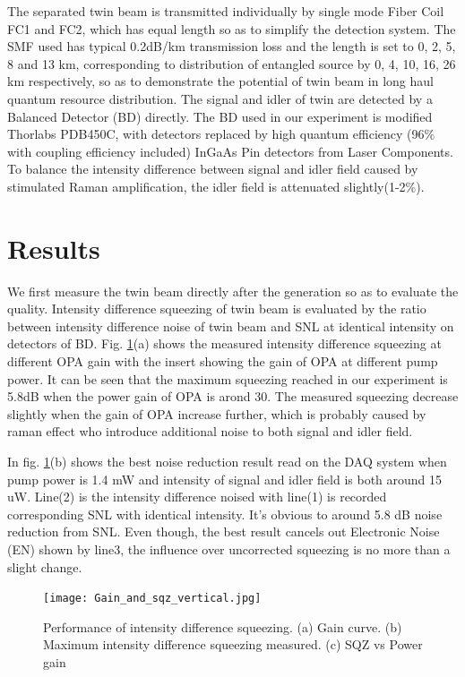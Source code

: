 \documentclass[9pt,twocolumn,twoside]{osajnl}
\begin{document}
The separated twin beam is transmitted individually by single mode Fiber Coil FC1 and FC2, which has equal length so as to simplify the detection system.
The SMF used has typical 0.2dB/km transmission loss and the length is set to 0, 2, 5, 8 and 13 km, corresponding to distribution of entangled source by 0, 4, 10, 16, 26 km respectively, so as to demonstrate the potential of twin beam in long haul quantum resource distribution.
The signal and idler of twin are detected by a Balanced Detector (BD) directly. The BD used in our experiment is modified Thorlabs PDB450C, with detectors replaced by high quantum efficiency (96\% with coupling efficiency included) InGaAs Pin detectors from Laser Components.
To balance the intensity difference between signal and idler field caused by stimulated Raman amplification, the idler field is attenuated slightly(1-2\%)\cite{guo12}.


\section{Results}

We first measure the twin beam directly after the generation so as to evaluate the quality.
Intensity difference squeezing of twin beam is evaluated by the ratio between intensity difference noise of twin beam and SNL at identical intensity on detectors of BD.
Fig. \ref{fig2_OPA}(a) shows the measured intensity difference squeezing at different OPA gain with the insert showing the gain of OPA at different pump power.
It can be seen that the maximum squeezing reached in our experiment is 5.8dB when the power gain of OPA is arond 30.
The measured squeezing decrease slightly when the gain of OPA increase further, which is probably caused by raman effect who introduce additional noise to both signal and idler field.

In fig. \ref{fig2_OPA}(b) shows the best noise reduction result read on the DAQ system when pump power is 1.4 mW and intensity of signal and idler field is both around 15 uW. Line(2) is the intensity difference noised with line(1) is recorded corresponding SNL with identical intensity. It's obvious to around 5.8 dB noise reduction from SNL. Even though, the best result cancels out Electronic Noise (EN) shown by line3, the influence over uncorrected squeezing is no more than a slight change.

\begin{figure}[htbp]
\centering
\texttt{[image: Gain\_and\_sqz\_vertical.jpg]}%
\caption{Performance of intensity difference squeezing. (a) Gain curve. (b) Maximum intensity difference squeezing measured. (c) SQZ vs Power gain}
\label{fig2_OPA}
\end{figure}
\end{document}
